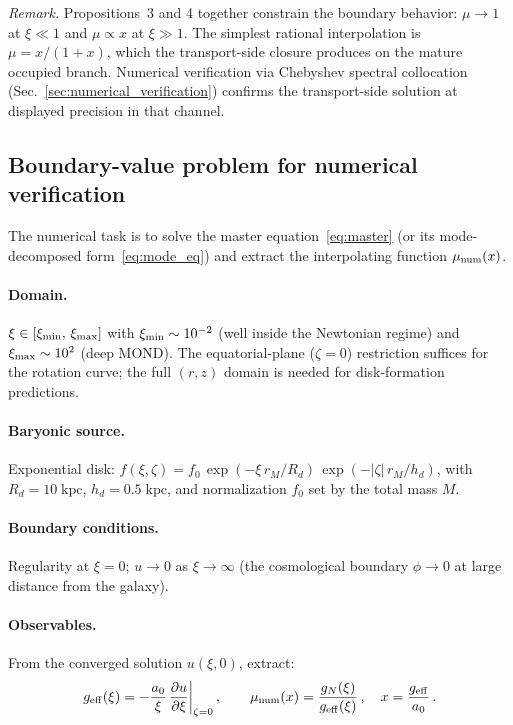 \documentclass[11pt]{article}
\begin{document}
\textit{Remark.}
Propositions~3 and 4 together constrain the boundary
behavior: $\mu \to 1$ at $\xi \ll 1$ and
$\mu \propto x$ at $\xi \gg 1$.  The simplest rational
interpolation is $\mu = x/(1+x)$, which the transport-side
closure produces on the mature occupied branch.  Numerical
verification via Chebyshev spectral collocation
(Sec.~\ref{sec:numerical_verification}) confirms the
transport-side solution at displayed precision in that channel.

\subsection{Boundary-value problem for numerical verification}
\label{sec:bvp}

The numerical task is to solve the master
equation~\eqref{eq:master} (or its mode-decomposed
form~\eqref{eq:mode_eq}) and extract the interpolating
function $\mu_{\rm num}(x)$.

\paragraph{Domain.}
$\xi \in [\xi_{\rm min},\,\xi_{\rm max}]$ with
$\xi_{\rm min} \sim 10^{-2}$ (well inside the Newtonian
regime) and $\xi_{\rm max} \sim 10^{2}$ (deep MOND).
The equatorial-plane ($\zeta = 0$) restriction suffices
for the rotation curve; the full $(r,z)$ domain is
needed for disk-formation predictions.

\paragraph{Baryonic source.}
Exponential disk:
$f(\xi,\zeta) = f_0\,\exp(-\xi\,r_M/R_d)\,
\exp(-|\zeta|\,r_M/h_d)$,
with $R_d = 10\;\mathrm{kpc}$, $h_d = 0.5\;\mathrm{kpc}$,
and normalization $f_0$ set by the total mass $M$.

\paragraph{Boundary conditions.}
Regularity at $\xi = 0$;
$u \to 0$ as $\xi \to \infty$ (the cosmological boundary
$\phi \to 0$ at large distance from the galaxy).

\paragraph{Observables.}
From the converged solution $u(\xi,0)$, extract:
\begin{equation}
g_{\rm eff}(\xi) = -\frac{a_0}{\xi}\,
  \frac{\partial u}{\partial\xi}\bigg|_{\zeta=0}\,,
\qquad
\mu_{\rm num}(x) = \frac{g_N(\xi)}{g_{\rm eff}(\xi)}\,,
\quad
x = \frac{g_{\rm eff}}{a_0}\,.
\label{eq:observables}
\end{equation}
\end{document}
